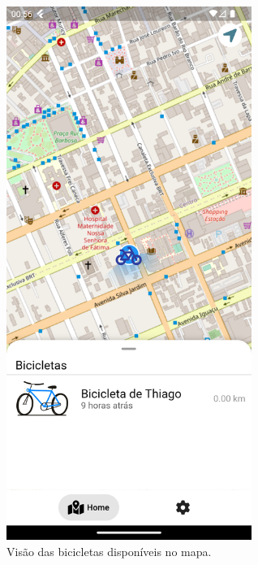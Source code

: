 \begin{figure}[!h]
\centering
\includegraphics[width=8cm]{capitulos/Figuras/app-map.png}
\caption{Visão das bicicletas disponíveis no mapa.}
\label{fig:app-map}
\end{figure}

\newpage

